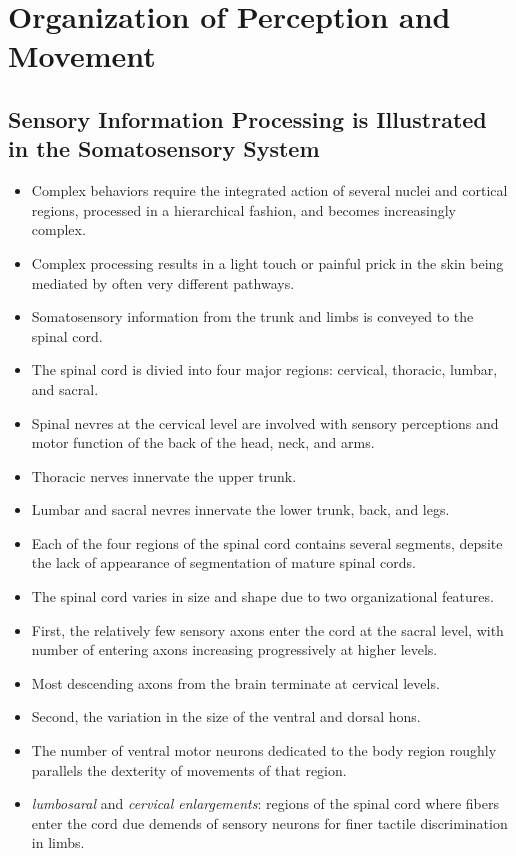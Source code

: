\documentclass[12pt,a4paper]{article}
\begin{document}
\clearpage
\section{Organization of Perception and Movement}
\subsection{Sensory Information Processing is Illustrated in the Somatosensory System}
\begin{itemize}
    \item Complex behaviors require the integrated action of several nuclei and cortical regions, processed in a hierarchical fashion, and becomes increasingly complex.
    \item Complex processing results in a light touch or painful prick in the skin being mediated by often very different pathways.
    \item Somatosensory information from the trunk and limbs is conveyed to the spinal cord.
    \item The spinal cord is divied into four major regions: cervical, thoracic, lumbar, and sacral.
    \item Spinal nevres at the cervical level are involved with sensory perceptions and motor function of the back of the head, neck, and arms.
    \item Thoracic nerves innervate the upper trunk.
    \item Lumbar and sacral nevres innervate the lower trunk, back, and legs.
    \item Each of the four regions of the spinal cord contains several segments, depsite the lack of appearance of segmentation of mature spinal cords.  
    \item The spinal cord varies in size and shape due to two organizational features.
    \item First, the relatively few sensory axons enter the cord at the sacral level, with number of entering axons increasing progressively at higher levels.
    \item Most descending axons from the brain terminate at cervical levels.
    \item Second, the variation in the size of the ventral and dorsal hons.
    \item The number of ventral motor neurons dedicated to the body region roughly parallels the dexterity of movements of that region.
    \item \textit{lumbosaral} and \textit{cervical enlargements}: regions of the spinal cord where fibers enter the cord due demends of sensory neurons for finer tactile discrimination in limbs.

\end{itemize}
\end{document}
